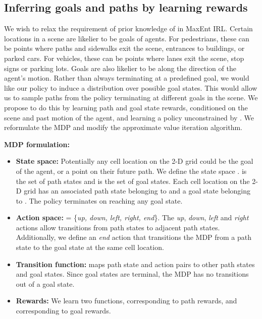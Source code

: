 \documentclass[journal]{IEEEtran}
\begin{document}
\subsection{Inferring goals and paths by learning rewards}\label{sec:maxentirl_changes}
We wish to relax the requirement of prior knowledge of  in MaxEnt IRL. Certain locations in a scene are likelier to be goals of agents. For pedestrians, these can be points where paths and sidewalks exit the scene, entrances to buildings, or parked cars. For vehicles, these can be points where lanes exit the scene, stop signs or parking lots. Goals are also likelier to be along the direction of the agent's motion. Rather than always terminating at a predefined goal, we would like our policy to induce a distribution over possible goal states. This would allow us to sample paths from the policy terminating at different goals in the scene. We propose to do this by learning path and goal state rewards, conditioned on the scene and past motion of the agent, and learning a policy unconstrained by . We reformulate the MDP and modify the approximate value iteration algorithm.

\vspace{0.15in}

\noindent\textbf{MDP formulation:}
\begin{itemize}
\vspace{0.05in}

    \item \textbf{State space:} Potentially any cell location on the 2-D grid could be the goal of the agent, or a point on their future path. We define the state space .  is the set of path states and  is the set of goal states. Each cell location on the 2-D grid has an associated path state belonging to  and a goal state belonging to . The policy terminates on reaching any goal state.   
    
    \vspace{0.05in}
    \item \textbf{Action space:}  = \{\textit{up, down, left, right, end}\}. The \textit{up}, \textit{down}, \textit{left} and \textit{right} actions allow transitions from path states to adjacent path states. Additionally, we define an \textit{end} action that transitions the MDP from a path state to the goal state at the same cell location.  
    \vspace{0.05in}
    \item \textbf{Transition function:}  maps path state and action pairs to other path states and goal states. Since goal states are terminal, the MDP has no transitions out of a goal state.  
    
    \vspace{0.05in}
    \item \textbf{Rewards:} We learn two functions,  corresponding to path rewards, and  corresponding to goal rewards. 
\end{itemize}
\end{document}
